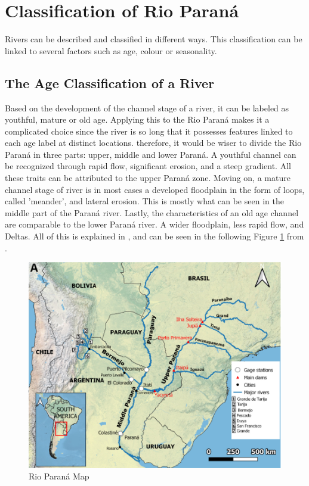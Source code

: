 \section{Classification of Rio Paraná}
Rivers can be described and classified in different ways. This classification can be linked to several factors such as age, colour or seasonality. 

\subsection{The Age Classification of a River}
Based on the development of the channel stage of a river, it can be labeled as youthful, mature or old age.  \autocite{davisGeographicalCycle1899}
Applying this to the Rio Paraná makes it a complicated choice since the river is so long that it possesses features linked to each age label at distinct locations. therefore, it would be wiser to divide the Rio Paraná in three parts: upper, middle and lower Paraná. A youthful channel can be recognized through rapid flow, significant erosion, and a steep gradient. All these traits can be attributed to the upper Paraná zone.
Moving on, a mature channel stage of river is in most cases a developed floodplain in the form of loops, called 'meander', and lateral erosion. This is mostly what can be seen in the middle part of the Paraná river.
Lastly, the characteristics of an old age channel are comparable to the lower Paraná river. A wider floodplain, less rapid flow, and Deltas. All of this is explained in \cite{orfeoParanaRiverArgentine2023}, and can be seen in the following Figure \ref{fig:rio parana map} from \cite{lopezweibelSourcesTemporalDynamics2022}.


\begin{figure}[H]
    \centering    \includegraphics[width=0.7\linewidth]{figures/ch2/map rio parana.png}
    \caption{Rio Paraná Map}
    \label{fig:rio parana map}
\end{figure}


